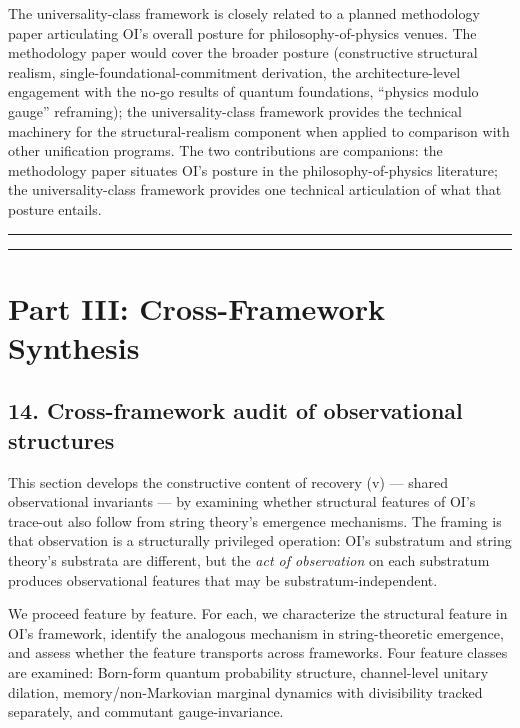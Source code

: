 \documentclass[
]{article}
\begin{document}
The universality-class framework is closely related to a planned
methodology paper articulating OI's overall posture for
philosophy-of-physics venues. The methodology paper would cover the
broader posture (constructive structural realism,
single-foundational-commitment derivation, the architecture-level
engagement with the no-go results of quantum foundations, ``physics
modulo gauge'' reframing); the universality-class framework provides the
technical machinery for the structural-realism component when applied to
comparison with other unification programs. The two contributions are
companions: the methodology paper situates OI's posture in the
philosophy-of-physics literature; the universality-class framework
provides one technical articulation of what that posture entails.

\begin{center}\rule{0.5\linewidth}{0.5pt}\end{center}

\begin{center}\rule{0.5\linewidth}{0.5pt}\end{center}

\hypertarget{part-iii-cross-framework-synthesis}{%
\section{Part III: Cross-Framework
Synthesis}\label{part-iii-cross-framework-synthesis}}

\hypertarget{cross-framework-audit-of-observational-structures}{%
\subsection{14. Cross-framework audit of observational
structures}\label{cross-framework-audit-of-observational-structures}}

This section develops the constructive content of recovery (v) ---
shared observational invariants --- by examining whether structural
features of OI's trace-out also follow from string theory's emergence
mechanisms. The framing is that observation is a structurally privileged
operation: OI's substratum and string theory's substrata are different,
but the \emph{act of observation} on each substratum produces
observational features that may be substratum-independent.

We proceed feature by feature. For each, we characterize the structural
feature in OI's framework, identify the analogous mechanism in
string-theoretic emergence, and assess whether the feature transports
across frameworks. Four feature classes are examined: Born-form quantum
probability structure, channel-level unitary dilation,
memory/non-Markovian marginal dynamics with divisibility tracked
separately, and commutant gauge-invariance.
\end{document}
